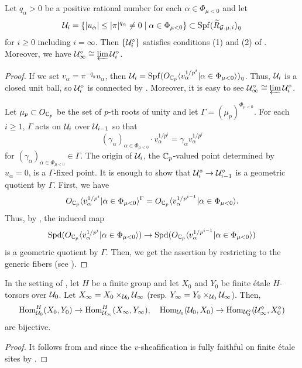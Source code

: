 \documentclass[12pt,reqno]{amsart}
\begin{document}
\begin{lem} \label{lem:ballsatis}
    Let $q_\alpha > 0$ be a positive rational number for each $\alpha \in \Phi_{\mu<0}$ and let
    \[
        {\mathcal{U}}_{i} = \{ \lvert u_\alpha \rvert \leq \lvert \pi \rvert^{q_\alpha} \neq 0 \mid \alpha \in \Phi_{\mu<0} \} \subset {\operatorname{Spf}}({\widetilde{R}}_{{\mathcal{G}},\mu,i})_\eta
    \]
    for $i \geq 0$ including $i = \infty$. Then $\{{\mathcal{U}}_i^{\diamond}\}$ satisfies conditions (1) and (2) of . Moreover, we have ${\mathcal{U}}_\infty^\diamond \cong \varprojlim {\mathcal{U}}_i^\diamond$. 
\end{lem}
\begin{proof}
    If we set $v_\alpha = \pi^{-q_\alpha}u_\alpha$, then ${\mathcal{U}}_i = {\operatorname{Spf}}(O_{\mathbb{C}_p} \langle v_\alpha^{1/p^i} \vert \alpha \in \Phi_{\mu<0} \rangle)_\eta$. Thus, ${\mathcal{U}}_i$ is a closed unit ball, so ${\mathcal{U}}_i^\diamond$ is connected by \cite[Lemma 15.6]{Sch17}. Moreover, it is easy to see ${\mathcal{U}}_\infty^\diamond \cong \varprojlim {\mathcal{U}}_i^\diamond$.
    
    Let $\mu_p \subset O_{\mathbb{C}_p}$ be the set of $p$-th roots of unity and let $\Gamma = (\mu_{p})^{\Phi_{\mu<0}}$. For each $i \geq 1$, $\Gamma$ acts on ${\mathcal{U}}_i$ over ${\mathcal{U}}_{i-1}$ so that
    \[
        (\gamma_\alpha)_{\alpha \in \Phi_{\mu<0}} \cdot v_{\alpha}^{1/p^i} = \gamma_\alpha v_{\alpha}^{1/p^i}
    \]
    for $(\gamma_\alpha)_{\alpha \in \Phi_{\mu<0}} \in \Gamma$. The origin of ${\mathcal{U}}_i$, the $\mathbb{C}_p$-valued point determined by $u_\alpha = 0$, is a $\Gamma$-fixed point. It is enough to show that ${\mathcal{U}}_i^\diamond \to {\mathcal{U}}_{i-1}^\diamond$ is a geometric quotient by $\Gamma$. First, we have 
    \[
        O_{\mathbb{C}_p} \langle v_\alpha^{1/p^i} \vert \alpha \in \Phi_{\mu<0} \rangle^{\Gamma} = O_{\mathbb{C}_p} \langle v_\alpha^{1/p^{i-1}} \vert \alpha \in \Phi_{\mu<0} \rangle. 
    \]  
    Thus, by \cite[Proposition 3.12]{Tak26_rel}, the induced map
    \[
        {\operatorname{Spd}}(O_{\mathbb{C}_p} \langle v_\alpha^{1/p^i} \vert \alpha \in \Phi_{\mu<0} \rangle) \to {\operatorname{Spd}}(O_{\mathbb{C}_p} \langle v_\alpha^{1/p^{i-1}} \vert \alpha \in \Phi_{\mu<0} \rangle)
    \]
    is a geometric quotient by $\Gamma$. Then, we get the assertion by restricting to the generic fibers (see \cite[Lemma 3.9]{Tak26_rel}). 
\end{proof}

\begin{cor} \label{prop:mapatinf}
    In the setting of , let $H$ be a finite group and let $X_{0}$ and $Y_{0}$ be finite \'{e}tale $H$-torsors over ${\mathcal{U}}_{0}$. Let $X_{\infty} = X_{0} \times_{{\mathcal{U}}_{0}} {\mathcal{U}}_{\infty}$ (resp. $Y_{\infty} = Y_{0} \times_{{\mathcal{U}}_{0}} {\mathcal{U}}_{\infty}$). Then,
    \[
        {\operatorname{Hom}}_{{\mathcal{U}}_{0}}^H(X_{0}, Y_{0}) \to {\operatorname{Hom}}_{{\mathcal{U}}_{\infty}}^H(X_{\infty}, Y_{\infty}), \quad {\operatorname{Hom}}_{{\mathcal{U}}_0}({\mathcal{U}}_0, X_0) \to {\operatorname{Hom}}_{{\mathcal{U}}_0^\diamond}({\mathcal{U}}_{\infty}^\diamond, X_0^\diamond)
    \]
    are bijective.
\end{cor}
\begin{proof}
    It follows from  and  since the $v$-sheafification is fully faithful on finite \'{e}tale sites by \cite[Lemma 15.6]{Sch17}.
\end{proof}
\end{document}
